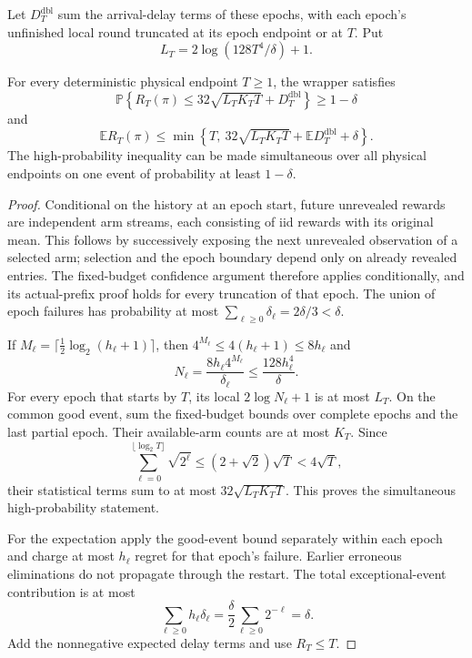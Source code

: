 Let $D_T^{\mathrm{dbl}}$ sum the arrival-delay terms of these epochs,
with each epoch's unfinished local round truncated at its epoch endpoint
or at $T$. Put
\[
 L_T=2\log(128T^4/\delta)+1.
\]
\begin{corollary}
\label{cor:ucbaa_physical_doubling}
For every deterministic physical endpoint $T\ge1$, the wrapper satisfies
\[
 \mathbb P\left\{R_T(\pi)\le
       32\sqrt{L_TK_TT}+D_T^{\mathrm{dbl}}\right\}\ge1-\delta
\]
and
\[
 \mathbb E R_T(\pi)\le
 \min\left\{T,\ 32\sqrt{L_TK_TT}
                  +\mathbb E D_T^{\mathrm{dbl}}+\delta\right\}.
\]
The high-probability inequality can be made simultaneous over all physical
endpoints on one event of probability at least $1-\delta$.
\end{corollary}
\begin{proof}
Conditional on the history at an epoch start, future unrevealed rewards
are independent arm streams, each consisting of iid rewards with its
original mean. This follows by
successively exposing the next unrevealed observation of a selected arm;
selection and the epoch boundary depend only on already revealed entries.
The fixed-budget confidence argument therefore applies conditionally,
and its actual-prefix proof holds for every truncation of that epoch.
The union of epoch failures has probability at most
$\sum_{\ell\ge0}\delta_\ell=2\delta/3<\delta$.

If $M_\ell=\lceil\tfrac12\log_2(h_\ell+1)\rceil$, then
$4^{M_\ell}\le4(h_\ell+1)\le8h_\ell$ and
\[
 N_\ell=\frac{8h_\ell4^{M_\ell}}{\delta_\ell}
       \le\frac{128h_\ell^4}{\delta}.
\]
For every epoch that starts by $T$, its local $2\log N_\ell+1$ is at
most $L_T$. On the common good event, sum the fixed-budget bounds over
complete epochs and the last partial epoch. Their available-arm counts
are at most $K_T$. Since
\[
 \sum_{\ell=0}^{\lfloor\log_2 T\rfloor}\sqrt{2^\ell}
 \le(2+\sqrt2)\sqrt T<4\sqrt T,
\]
their statistical terms sum to at most $32\sqrt{L_TK_TT}$.
This proves the simultaneous high-probability statement.

For the expectation apply the good-event bound separately within each
epoch and charge at most $h_\ell$ regret for that epoch's failure.
Earlier erroneous eliminations do not propagate through the restart.
The total exceptional-event contribution is at most
\[
 \sum_{\ell\ge0}h_\ell\delta_\ell
    =\frac\delta2\sum_{\ell\ge0}2^{-\ell}=\delta.
\]
Add the nonnegative expected delay terms and use $R_T\le T$.
\end{proof}


